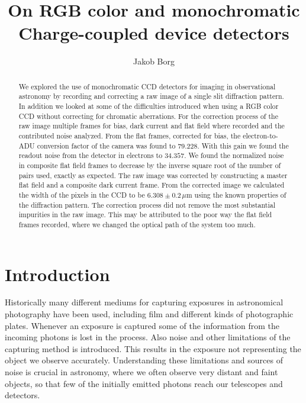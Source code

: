 \documentclass{emulateapj}
\begin{document}
\title{On RGB color and monochromatic Charge-coupled device detectors}

\author{Jakob Borg}


  
\begin{abstract}
  We explored the use of monochromatic CCD detectors for imaging in observational astronomy by recording and correcting a raw image of a single slit diffraction pattern. In addition we looked at some of the difficulties introduced when using a RGB color CCD without correcting for chromatic aberrations. For the correction process of the raw image multiple frames for bias, dark current and flat field where recorded and the contributed noise analyzed. From the flat frames, corrected for bias, the electron-to-ADU conversion factor of the camera was found to $79.228$. With this gain we found the readout noise from the detector in electrons to $34.357$. We found the normalized noise in composite flat field frames to decrease by the inverse square root of the number of pairs used, exactly as expected. The raw image was corrected by constructing a master flat field and a composite dark current frame. From the corrected image we calculated the width of the pixels in the CCD to be $6.308 \pm 0.2 \,\mu$m using the known properties of the diffraction pattern. The correction process did not remove the most substantial impurities in the raw image. This may be attributed to the poor way the flat field frames recorded, where we changed the optical path of the system too much.
\end{abstract}

\section{Introduction}
\label{sec:introduction}
Historically many different mediums for capturing exposures in astronomical photography have been used, including film and different kinds of photographic plates. Whenever an exposure is captured some of the information from the incoming photons is lost in the process. Also noise and other limitations of the capturing method is introduced. This results in the exposure not representing the object we observe accurately. Understanding these limitations and sources of noise is crucial in astronomy, where we often observe very distant and faint objects, so that few of the initially emitted photons reach our telescopes and detectors.
\end{document}
